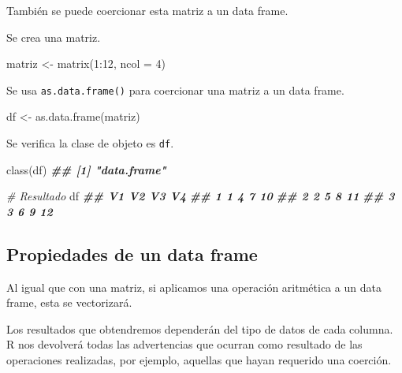 \documentclass[
]{book}
\newenvironment{Shaded}{\begin{snugshade}}{\end{snugshade}}
\newcommand{\AttributeTok}[1]{\textcolor[rgb]{0.77,0.63,0.00}{#1}}
\newcommand{\CommentTok}[1]{\textcolor[rgb]{0.56,0.35,0.01}{\textit{#1}}}
\newcommand{\DecValTok}[1]{\textcolor[rgb]{0.00,0.00,0.81}{#1}}
\newcommand{\DocumentationTok}[1]{\textcolor[rgb]{0.56,0.35,0.01}{\textbf{\textit{#1}}}}
\newcommand{\FunctionTok}[1]{\textcolor[rgb]{0.00,0.00,0.00}{#1}}
\newcommand{\NormalTok}[1]{#1}
\newcommand{\OtherTok}[1]{\textcolor[rgb]{0.56,0.35,0.01}{#1}}
\newcommand{\SpecialCharTok}[1]{\textcolor[rgb]{0.00,0.00,0.00}{#1}}
\begin{document}
También se puede coercionar esta matriz a un data frame.

Se crea una matriz.

\begin{Shaded}
\begin{Highlighting}[]
\NormalTok{matriz }\OtherTok{\textless{}{-}} \FunctionTok{matrix}\NormalTok{(}\DecValTok{1}\SpecialCharTok{:}\DecValTok{12}\NormalTok{, }\AttributeTok{ncol =} \DecValTok{4}\NormalTok{)}
\end{Highlighting}
\end{Shaded}

Se usa \texttt{as.data.frame()} para coercionar una matriz a un data frame.

\begin{Shaded}
\begin{Highlighting}[]
\NormalTok{df }\OtherTok{\textless{}{-}} \FunctionTok{as.data.frame}\NormalTok{(matriz)}
\end{Highlighting}
\end{Shaded}

Se verifica la clase de objeto es \texttt{df}.

\begin{Shaded}
\begin{Highlighting}[]
\FunctionTok{class}\NormalTok{(df)}
\DocumentationTok{\#\# [1] "data.frame"}

\CommentTok{\# Resultado}
\NormalTok{df}
\DocumentationTok{\#\#   V1 V2 V3 V4}
\DocumentationTok{\#\# 1  1  4  7 10}
\DocumentationTok{\#\# 2  2  5  8 11}
\DocumentationTok{\#\# 3  3  6  9 12}
\end{Highlighting}
\end{Shaded}

\hypertarget{propiedades-de-un-data-frame}{%
\subsection{Propiedades de un data frame}\label{propiedades-de-un-data-frame}}

Al igual que con una matriz, si aplicamos una operación aritmética a un data frame, esta se vectorizará.

Los resultados que obtendremos dependerán del tipo de datos de cada columna. R nos devolverá todas las advertencias que ocurran como resultado de las operaciones realizadas, por ejemplo, aquellas que hayan requerido una coerción.
\end{document}
